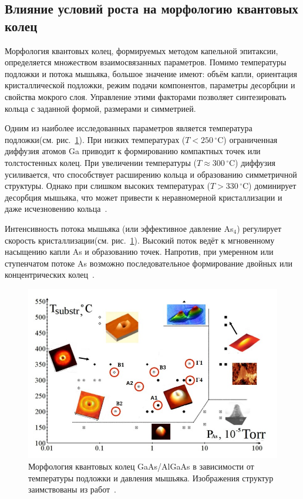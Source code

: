 \documentclass[14pt,oneside]{extarticle}
\begin{document}
\subsection{Влияние условий роста на морфологию квантовых колец}

Морфология квантовых колец, формируемых методом капельной эпитаксии, определяется множеством взаимосвязанных параметров. Помимо температуры подложки и потока мышьяка, большое значение имеют: объём капли, ориентация кристаллической подложки, режим подачи компонентов, параметры десорбции и свойства мокрого слоя. Управление этими факторами позволяет синтезировать кольца с заданной формой, размерами и симметрией.

Одним из наиболее исследованных параметров является температура подложки(см. рис.~\ref{fig:morph_map}). При низких температурах ($T < 250\,^{\circ}\mathrm{C}$) ограниченная диффузия атомов Ga приводит к формированию компактных точек или толстостенных колец. При увеличении температуры ($T \approx 300\,^{\circ}\mathrm{C}$) диффузия усиливается, что способствует расширению кольца и образованию симметричной структуры. Однако при слишком высоких температурах ($T > 330\,^{\circ}\mathrm{C}$) доминирует десорбция мышьяка, что может привести к неравномерной кристаллизации и даже исчезновению кольца~\cite{sibirmovskiy2014,vasilevskiy2013}.

Интенсивность потока мышьяка (или эффективное давление As$_4$) регулирует скорость кристаллизации(см. рис.~\ref{fig:morph_map}). Высокий поток ведёт к мгновенному насыщению капли As и образованию точек. Напротив, при умеренном или ступенчатом потоке As возможно последовательное формирование двойных или концентрических колец~\cite{zhou2013,fan2023}.

\begin{figure}
    \begin{center}
        \includegraphics[width=14cm]{images/morphology_map.png}
        \caption{\label{fig:morph_map}
            Морфология квантовых колец GaAs/AlGaAs в зависимости от температуры подложки и давления мышьяка. Изображения структур заимствованы из работ~\cite{mano2005nano, koguchi2005growth, vasilevskiy2013}.}
    \end{center}
\end{figure}
\end{document}
